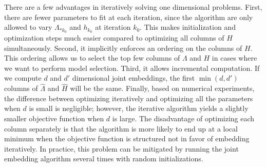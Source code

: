 \documentclass[10pt,journal,compsoc]{IEEEtran}
\begin{document}
\noindent There are a few advantages in iteratively solving one dimensional problems. First, there are fewer parameters to fit at each iteration, since the algorithm are only allowed to vary $\Lambda_{*k_0}$ and $h_{k_0}$ at iteration $k_0$. This makes initialization and optimization steps much easier compared to optimizing all columns of $H$ simultaneously. Second, it implicitly enforces an ordering on the columns of $H$. This ordering allows us to select the top few columns of $\Lambda$ and $H$ in cases where we want to perform model selection. Third, it allows incremental computation. If we compute $d$ and $d'$ dimensional joint embeddings, the first $\min(d,d')$ columns of $\hat{\Lambda}$ and $\hat{H}$ will be the same. Finally, based on numerical experiments, the difference between optimizing iteratively and optimizing all the parameters when $d$ is small is negligible; however, the iterative algorithm yields a slightly smaller objective function when $d$ is large. The disadvantage of optimizing each column separately is that the algorithm is more likely to end up at a local minimum when the objective function is structured not in favor of embedding iteratively. In practice, this problem can be mitigated by running the joint embedding algorithm several times with random initializations. \\ 
\end{document}
